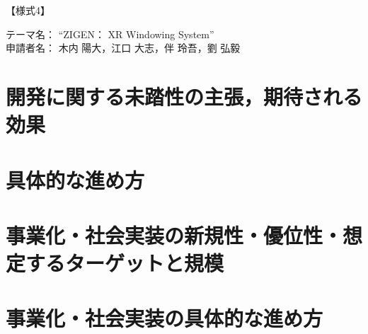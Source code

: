 \documentclass[uplatex]{jsarticle}
\begin{document}
\begin{flushright}
  【様式4】
\end{flushright}
テーマ名： ``ZIGEN： XR Windowing System'' \\
申請者名： 木内 陽大，江口 大志，伴 玲吾，劉 弘毅



\section{開発に関する未踏性の主張，期待される効果}


\section{具体的な進め方}


\section{事業化・社会実装の新規性・優位性・想定するターゲットと規模}


\section{事業化・社会実装の具体的な進め方}
\end{document}
